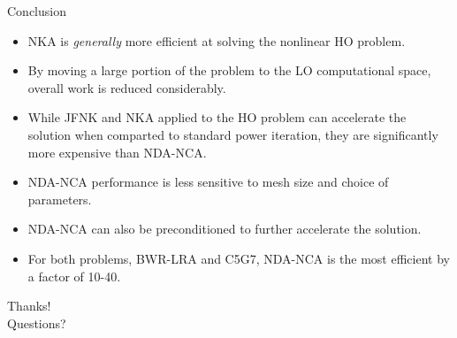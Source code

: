 \documentclass[sans,mathserif,aspectratio=169]{beamer}
\begin{document}
\begin{frame}{Conclusion}
\begin{itemize}
 \item NKA is \emph{generally} more efficient at solving the nonlinear HO problem.
 \item By moving a large portion of the problem to the LO computational space, overall work is reduced considerably. 
 \item While JFNK and NKA applied to the HO problem can accelerate the solution when comparted to standard power iteration, they are significantly  more expensive than
       NDA-NCA.
 \item NDA-NCA performance is less sensitive to mesh size and choice of parameters.
 \item NDA-NCA can also be preconditioned to further accelerate the solution.
 \item For both problems, BWR-LRA and C5G7, NDA-NCA is the most efficient by a factor of 10-40.
\end{itemize}
\end{frame}

\begin{frame}
\centering
\Huge
Thanks! \\
Questions?
\end{frame}
\end{document}
